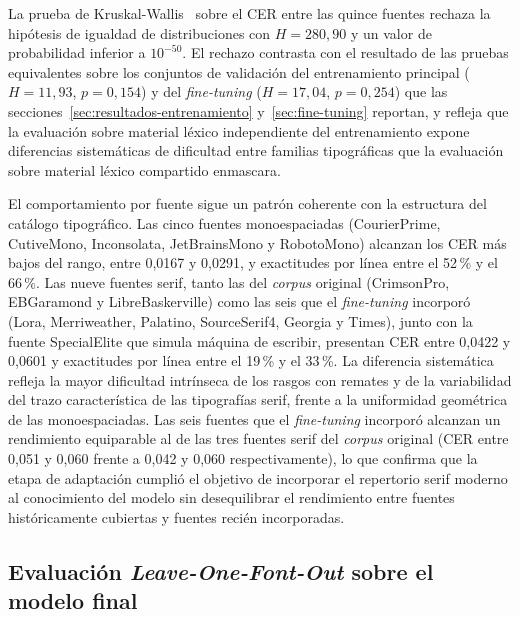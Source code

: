 La prueba de Kruskal-Wallis~\cite{kruskal1952ranks} sobre el CER entre las quince fuentes rechaza la hipótesis de igualdad de distribuciones con $H = 280{,}90$ y un valor de probabilidad inferior a $10^{-50}$. El rechazo contrasta con el resultado de las pruebas equivalentes sobre los conjuntos de validación del entrenamiento principal ($H = 11{,}93$, $p = 0{,}154$) y del \textit{fine-tuning} ($H = 17{,}04$, $p = 0{,}254$) que las secciones~\ref{sec:resultados-entrenamiento} y~\ref{sec:fine-tuning} reportan, y refleja que la evaluación sobre material léxico independiente del entrenamiento expone diferencias sistemáticas de dificultad entre familias tipográficas que la evaluación sobre material léxico compartido enmascara.

El comportamiento por fuente sigue un patrón coherente con la estructura del catálogo tipográfico. Las cinco fuentes monoespaciadas (CourierPrime, CutiveMono, Inconsolata, JetBrainsMono y RobotoMono) alcanzan los CER más bajos del rango, entre 0,0167 y 0,0291, y exactitudes por línea entre el 52\,\% y el 66\,\%. Las nueve fuentes serif, tanto las del \textit{corpus} original (CrimsonPro, EBGaramond y LibreBaskerville) como las seis que el \textit{fine-tuning} incorporó (Lora, Merriweather, Palatino, SourceSerif4, Georgia y Times), junto con la fuente SpecialElite que simula máquina de escribir, presentan CER entre 0,0422 y 0,0601 y exactitudes por línea entre el 19\,\% y el 33\,\%. La diferencia sistemática refleja la mayor dificultad intrínseca de los rasgos con remates y de la variabilidad del trazo característica de las tipografías serif, frente a la uniformidad geométrica de las monoespaciadas. Las seis fuentes que el \textit{fine-tuning} incorporó alcanzan un rendimiento equiparable al de las tres fuentes serif del \textit{corpus} original (CER entre 0,051 y 0,060 frente a 0,042 y 0,060 respectivamente), lo que confirma que la etapa de adaptación cumplió el objetivo de incorporar el repertorio serif moderno al conocimiento del modelo sin desequilibrar el rendimiento entre fuentes históricamente cubiertas y fuentes recién incorporadas.

\subsection{Evaluación \textit{Leave-One-Font-Out} sobre el modelo final}
\label{subsec:lofo-post-ft}

